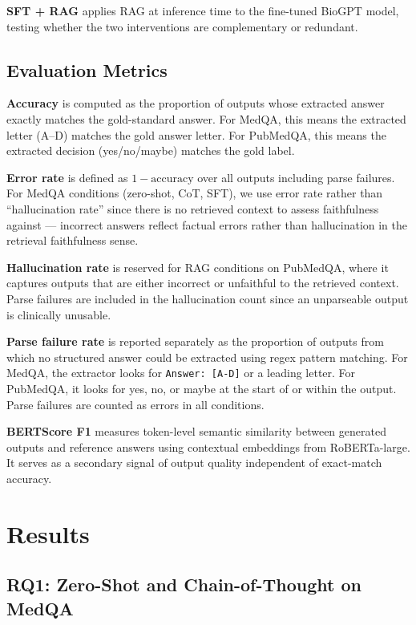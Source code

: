 \documentclass[11pt]{article}
\begin{document}
\textbf{SFT + RAG} applies RAG at inference time to the fine-tuned 
BioGPT model, testing whether the two interventions are complementary 
or redundant.

\subsection{Evaluation Metrics}

\textbf{Accuracy} is computed as the proportion of outputs whose 
extracted answer exactly matches the gold-standard answer. For MedQA, 
this means the extracted letter (A--D) matches the gold answer letter. 
For PubMedQA, this means the extracted decision (yes/no/maybe) matches 
the gold label.

\textbf{Error rate} is defined as $1 - \text{accuracy}$ over all 
outputs including parse failures. For MedQA conditions (zero-shot, CoT, 
SFT), we use error rate rather than ``hallucination rate'' since there 
is no retrieved context to assess faithfulness against --- incorrect 
answers reflect factual errors rather than hallucination in the 
retrieval faithfulness sense.

\textbf{Hallucination rate} is reserved for RAG conditions on PubMedQA, 
where it captures outputs that are either incorrect or unfaithful to the 
retrieved context. Parse failures are included in the hallucination 
count since an unparseable output is clinically unusable.

\textbf{Parse failure rate} is reported separately as the proportion of 
outputs from which no structured answer could be extracted using regex 
pattern matching. For MedQA, the extractor looks for \texttt{Answer: 
[A-D]} or a leading letter. For PubMedQA, it looks for yes, no, or 
maybe at the start of or within the output. Parse failures are counted 
as errors in all conditions.

\textbf{BERTScore F1} \cite{zhang2019bertscore} measures token-level 
semantic similarity between generated outputs and reference answers 
using contextual embeddings from RoBERTa-large. It serves as a 
secondary signal of output quality independent of exact-match accuracy.

\section{Results}

\subsection{RQ1: Zero-Shot and Chain-of-Thought on MedQA}
\end{document}
